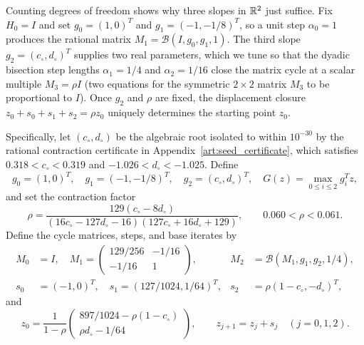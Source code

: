 Counting degrees of freedom shows why three slopes in $\mathbb R^2$ just suffice. Fix
$H_0=I$ and set $g_0=(1,0)^T$ and $g_1=(-1,-1/8)^T$, so a unit step $\alpha_0=1$
produces the rational matrix $M_1=\mathcal B(I,g_0,g_1,1)$. The third slope
$g_2=(c_\circ,d_\circ)^T$ supplies two real parameters, which we tune so that
the dyadic bisection step lengths $\alpha_1=1/4$ and $\alpha_2=1/16$ close the
matrix cycle at a scalar multiple $M_3=\rho I$ (two equations for the symmetric
$2\times2$ matrix $M_3$ to be proportional to $I$). Once $g_2$ and $\rho$ are
fixed, the displacement closure $z_0+s_0+s_1+s_2=\rho z_0$ uniquely determines
the starting point $z_0$.

Specifically, let $(c_\circ,d_\circ)$ be the algebraic root isolated to within
$10^{-30}$ by the rational contraction certificate in
Appendix~\ref{art:seed_certificate}, which satisfies $0.318<c_\circ<0.319$ and
$-1.026<d_\circ<-1.025$. Define
\[
 g_0=(1,0)^T,\quad g_1=(-1,-1/8)^T,\quad g_2=(c_\circ,d_\circ)^T,
 \quad G(z)=\max_{0\le i\le2}g_i^Tz,
\]
and set the contraction factor
\begin{equation}\label{art:seed_rho}
 \rho=\frac{129(c_\circ-8d_\circ)}{(16c_\circ-127d_\circ-16)(127c_\circ+16d_\circ+129)},
 \qquad 0.060<\rho<0.061.
\end{equation}
Define the cycle matrices, steps, and base iterates by
\begin{align}
 M_0&=I,\quad
 M_1=\begin{pmatrix}129/256&-1/16\\-1/16&1\end{pmatrix},
 &M_2&=\mathcal B(M_1,g_1,g_2,1/4),\label{art:seed_matrices}\\
 s_0&=(-1,0)^T,\quad s_1=(127/1024,1/64)^T,
 &s_2&=\rho(1-c_\circ,-d_\circ)^T,\label{art:seed_steps}
\end{align}
and
\begin{equation}\label{art:seed_points}
 z_0=\frac1{1-\rho}
 \begin{pmatrix}897/1024-\rho(1-c_\circ)\\ \rho d_\circ-1/64\end{pmatrix},
 \qquad z_{j+1}=z_j+s_j\quad(j=0,1,2).
\end{equation}

